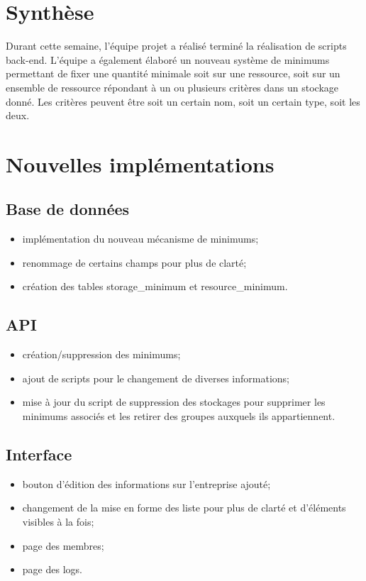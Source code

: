 \documentclass[a4paper, 12pt]{report}
\begin{document}
	\tableofcontents


	\newpage

	\chapter*{Synthèse}
		Durant cette semaine, l’équipe projet a réalisé terminé la réalisation de scripts back-end.
		L’équipe a également élaboré un nouveau système de minimums permettant de fixer une quantité minimale soit sur une ressource, soit sur un ensemble de ressource répondant à un ou plusieurs critères dans un stockage donné. Les critères peuvent être soit un certain nom, soit un certain type, soit les deux.



	 \chapter{Nouvelles implémentations}
	 	\section{Base de données}
	 		\begin{itemize}
	 			\item implémentation du nouveau mécanisme de minimums;
				\item renommage de certains champs pour plus de clarté;
				\item création des tables storage\_minimum et resource\_minimum.
	 		\end{itemize}

		\section{API}
			\begin{itemize}
				\item création/suppression des minimums;
				\item ajout de scripts pour le changement de diverses informations;
				\item mise à jour du script de suppression des stockages pour supprimer les minimums associés et les retirer des groupes auxquels ils appartiennent.

			\end{itemize}

		\section{Interface}
			\begin{itemize}
				\item bouton d’édition des informations sur l’entreprise ajouté;
				\item changement de la mise en forme des liste pour plus de clarté et d’éléments visibles à la fois;
				\item page des membres;
				\item page des logs.

			\end{itemize}
\end{document}

